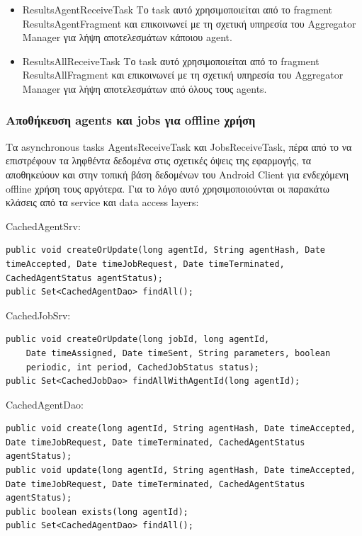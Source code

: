 \documentclass[a4paper,11pt]{article}
\begin{document}
\begin{sloppypar}
\begin{itemize}
\item ResultsAgentReceiveTask
\newline
Το task αυτό χρησιμοποιείται από το fragment ResultsAgentFragment και επικοινωνεί με τη σχετική υπηρεσία του Aggregator Manager για λήψη αποτελεσμάτων κάποιου agent.

\item ResultsAllReceiveTask
\newline
Το task αυτό χρησιμοποιείται από το fragment ResultsAllFragment και επικοινωνεί με τη σχετική υπηρεσία του Aggregator Manager για λήψη αποτελεσμάτων από όλους τους agents.

\end{itemize}

\newpage

\subsubsection{Αποθήκευση agents και jobs για offline χρήση}

Τα asynchronous tasks AgentsReceiveTask και JobsReceiveTask, πέρα από το να επιστρέφουν τα ληφθέντα δεδομένα στις σχετικές όψεις της εφαρμογής, τα αποθηκεύουν και στην τοπική βάση δεδομένων του Android Client για ενδεχόμενη offline χρήση τους αργότερα. Για το λόγο αυτό χρησιμοποιούνται οι παρακάτω κλάσεις από τα service και data access layers:

CachedAgentSrv:
\begin{lstlisting}
public void createOrUpdate(long agentId, String agentHash, Date timeAccepted, Date timeJobRequest, Date timeTerminated, CachedAgentStatus agentStatus);
public Set<CachedAgentDao> findAll();
\end{lstlisting}

CachedJobSrv:
\begin{lstlisting}
public void createOrUpdate(long jobId, long agentId,
    Date timeAssigned, Date timeSent, String parameters, boolean
    periodic, int period, CachedJobStatus status);
public Set<CachedJobDao> findAllWithAgentId(long agentId);
\end{lstlisting}

CachedAgentDao:

\begin{lstlisting}
public void create(long agentId, String agentHash, Date timeAccepted, Date timeJobRequest, Date timeTerminated, CachedAgentStatus agentStatus);
public void update(long agentId, String agentHash, Date timeAccepted, Date timeJobRequest, Date timeTerminated, CachedAgentStatus agentStatus);
public boolean exists(long agentId);
public Set<CachedAgentDao> findAll();
\end{lstlisting}


\end{sloppypar}
\end{document}
